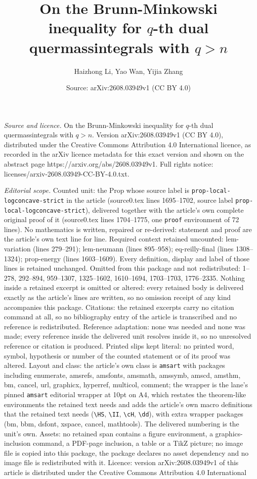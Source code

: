 \documentclass[10pt,a4paper]{amsart}
\title[On the Brunn-Minkowski inequality for $q$-th dual quermassin]{On the Brunn-Minkowski inequality for $q$-th dual quermassintegrals with $q>n$}
\author{Haizhong Li, Yao Wan, Yijia Zhang}
\date{Source: arXiv:2608.03949v1 (CC BY 4.0)}
\begin{document}
\maketitle

\noindent\emph{Source and licence.} On the Brunn-Minkowski inequality for $q$-th dual quermassintegrals with $q>n$. Version arXiv:2608.03949v1 (CC BY 4.0), distributed under the Creative Commons Attribution 4.0 International licence, as recorded in the arXiv licence metadata for this exact version and shown on the abstract page https://arxiv.org/abs/2608.03949v1. Full rights notice: licenses/arxiv-2608.03949-CC-BY-4.0.txt.\par\smallskip

\noindent\textit{Editorial scope.} Counted unit: the Prop whose source label is \texttt{prop-local-logconcave-strict} in the article (source0.tex lines 1695--1702, source label \texttt{prop-local-logconcave-strict}), delivered together with the article's own complete original proof of it (source0.tex lines 1704--1775, one \texttt{proof} environment of 72 lines). No mathematics is written, repaired or re-derived: statement and proof are the article's own text line for line. Required context retained uncounted: lem-variation (lines 279--291); lem-neumann (lines 895--958); eq-reilly-final (lines 1308--1324); prop-energy (lines 1603--1609). Every definition, display and label of those lines is retained unchanged. Omitted from this package and not redistributed: 1--278, 292--894, 959--1307, 1325--1602, 1610--1694, 1703--1703, 1776--2335. Nothing inside a retained excerpt is omitted or altered: every retained body is delivered exactly as the article's lines are written, so no omission receipt of any kind accompanies this package. Citations: the retained excerpts carry no citation command at all, so no bibliography entry of the article is transcribed and no reference is redistributed. Reference adaptation: none was needed and none was made; every reference inside the delivered unit resolves inside it, so no unresolved reference or citation is produced. Printed slips kept literal: no printed word, symbol, hypothesis or number of the counted statement or of its proof was altered. Layout and class: the article's own class is \texttt{amsart} with packages including enumerate, amsrefs, amsfonts, amsmath, amssymb, amscd, amsthm, bm, cancel, url, graphicx, hyperref, multicol, comment; the wrapper is the lane's pinned \texttt{amsart} editorial wrapper at 10pt on A4, which restates the theorem-like environments the retained text needs and adds the article's own macro definitions that the retained text needs (\texttt{\textbackslash HS}, \texttt{\textbackslash II}, \texttt{\textbackslash cH}, \texttt{\textbackslash dd}), with extra wrapper packages (bm, bbm, dsfont, xspace, cancel, mathtools). The delivered numbering is the unit's own. Assets: no retained span contains a figure environment, a graphics-inclusion command, a PDF-page inclusion, a table or a TikZ picture; no image file is copied into this package, the package declares no asset dependency and no image file is redistributed with it. Licence: version arXiv:2608.03949v1 of this article is distributed under the Creative Commons Attribution 4.0 International 
\end{document}
